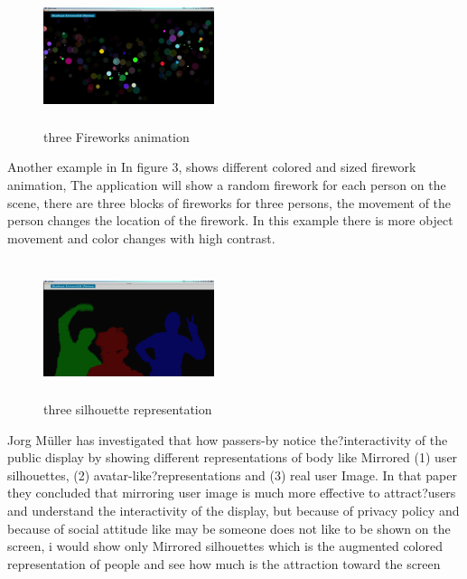 \begin{figure} %
    \centering
\includegraphics[width=50mm,height=40mm]{Figures/3/fireworks}
\caption{three Fireworks animation}
\label{fig:fireworks}
\end{figure}

\par
Another example in In figure 3, shows different colored and sized firework animation, The application will show a random firework for each person on the scene, there are three blocks of fireworks for three persons, the movement of the person changes the location of the firework. In this example there is more object movement and color changes with high contrast.

\newpage
\begin{figure} %
    \centering
\includegraphics[width=50mm,height=40mm]{Figures/3/silhouttee}
\caption{three silhouette representation}
\label{fig:silhouttee}
\end{figure}


Jorg Müller \cite{LookingGlass} has investigated that how passers-by notice the?interactivity of the public display by showing different representations of body like Mirrored (1) user silhouettes, (2) avatar-like?representations and (3) real user Image. In that paper they concluded that mirroring user image is much more effective to attract?users and understand the interactivity of the display, but because of privacy policy and because of social attitude like may be someone does not like to be shown on the screen, i would show only  Mirrored silhouettes which is the augmented colored representation of people and see how much is the attraction toward the screen

